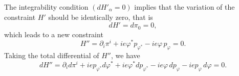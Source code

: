 \documentclass[12pt]{article}
\begin{document}
\indent The integrability condition $(dH'_{\alpha}=0)$ implies
that the variation of the constraint $H'$ should be identically
zero, that is
\begin{equation}\label{36}
dH'=d\pi_{0}=0,
\end{equation}
which leads to a new constraint
\begin{equation}\label{37}
H''=\partial_{i}\pi^{i}+ie\varphi^{\ast}p_{{\varphi}^{\ast}}-ie\varphi\,p_{\varphi}=0.
\end{equation}
Taking the total differential of $H''$, we have
\begin{equation}\label{38}
dH''=\partial_{i}d\pi^{i}+iep_{{\varphi}^{\ast}}d\varphi^{\ast}+ie\varphi^{\ast}dp_{{\varphi}^{\ast}}-ie\varphi\,dp_{\varphi}-iep_{\varphi}\,d\varphi=0.
\end{equation}
\end{document}
